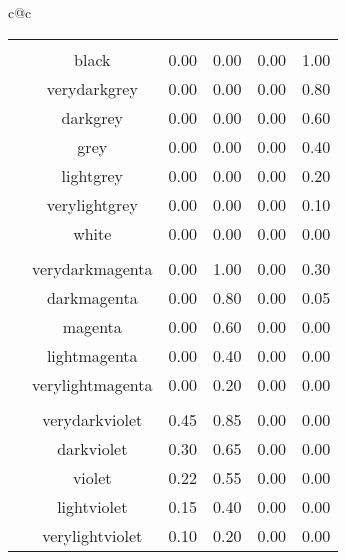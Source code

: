 %
%
%
%
\label{sec:colortable}
\newcommand{\clrow}[1]{
  \fcolorbox{black}{#1}{
    \textcolor{#1}{\rule[-.3ex]{1cm}{1.8ex}}
    } %
  & #1
  } %
%
\newcommand{\clspc}{&&&&&\\}
%
\vfill
\begin{table}[!ht]
\begin{center}
\begin{scriptsize}
\begin{tabular}{c@{\quad}c}
    \begin{tabular}{|c|c|cccc|} \hline
\clspc
\clrow{black}                   & 0.00 & 0.00 & 0.00 & 1.00 \\
\clrow{verydarkgrey}            & 0.00 & 0.00 & 0.00 & 0.80 \\
\clrow{darkgrey}                & 0.00 & 0.00 & 0.00 & 0.60 \\
\clrow{grey}                    & 0.00 & 0.00 & 0.00 & 0.40 \\
\clrow{lightgrey}               & 0.00 & 0.00 & 0.00 & 0.20 \\
\clrow{verylightgrey}           & 0.00 & 0.00 & 0.00 & 0.10 \\
\clrow{white}                   & 0.00 & 0.00 & 0.00 & 0.00 \\
\clspc
\clrow{verydarkmagenta}         & 0.00 & 1.00 & 0.00 & 0.30 \\
\clrow{darkmagenta}             & 0.00 & 0.80 & 0.00 & 0.05 \\
\clrow{magenta}                 & 0.00 & 0.60 & 0.00 & 0.00 \\
\clrow{lightmagenta}            & 0.00 & 0.40 & 0.00 & 0.00 \\
\clrow{verylightmagenta}        & 0.00 & 0.20 & 0.00 & 0.00 \\
\clspc
\clrow{verydarkviolet}          & 0.45 & 0.85 & 0.00 & 0.00 \\
\clrow{darkviolet}              & 0.30 & 0.65 & 0.00 & 0.00 \\
\clrow{violet}                  & 0.22 & 0.55 & 0.00 & 0.00 \\
\clrow{lightviolet}             & 0.15 & 0.40 & 0.00 & 0.00 \\
\clrow{verylightviolet}         & 0.10 & 0.20 & 0.00 & 0.00 \\

\end{tabular}
\end{tabular}
\end{scriptsize}
\end{center}
\end{table}
